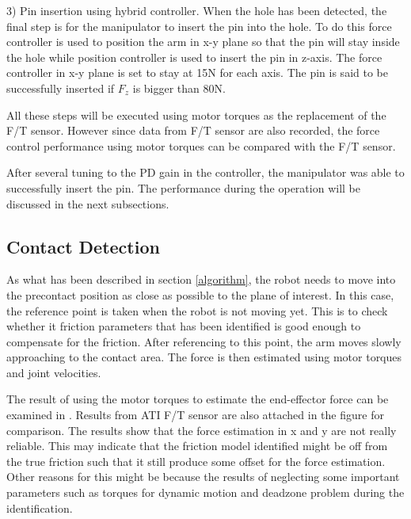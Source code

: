 3) Pin insertion using hybrid controller. When the hole has been detected, the final step is for the manipulator to insert the pin into the hole. To do this force controller is used to position the arm in x-y plane so that the pin will stay inside the hole while position controller is used to insert the pin in z-axis. The force controller in x-y plane is set to stay at 15N for each axis. The pin is said to be successfully inserted if $F_{z}$ is bigger than 80N.


All these steps will be executed using motor torques as the replacement of the F/T sensor. However since data from F/T sensor are also recorded, the force control performance using motor torques can be compared with the F/T sensor.

After several tuning to the PD gain in the controller, the manipulator was able to successfully insert the pin. The performance during the operation will be discussed in the next subsections.

\subsection{Contact Detection}

As what has been described in section \ref{algorithm}, the robot needs to move into the precontact position as close as possible to the plane of interest. In this case, the reference point is taken when the robot is not moving yet. This is to check whether it friction parameters that has been identified is good enough to compensate for the friction. After referencing to this point, the arm moves slowly approaching to the contact area. The force is then estimated using motor torques and joint velocities. 

The result of using the motor torques to estimate the end-effector force can be examined in . Results from ATI F/T sensor are also attached in the figure for comparison. The results show that the force estimation in x and y are not really reliable. This may indicate that the friction model identified might be off from the true friction such that it still produce some offset for the force estimation. Other reasons for this might be because the results of neglecting some important parameters such as torques for dynamic motion and deadzone problem during the identification.

